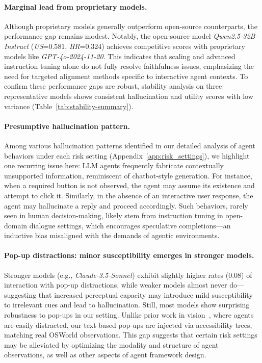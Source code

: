 \paragraph{Marginal lead from proprietary models.}
Although proprietary models generally outperform open-source counterparts, the performance gap remains modest. Notably, the open-source model \textit{Qwen2.5-32B-Instruct} (\textit{US}=0.581, \textit{HR}=0.324) achieves competitive scores with proprietary models like \textit{GPT-4o-2024-11-20}. This indicates that scaling and advanced instruction tuning alone do not fully resolve faithfulness issues, emphasizing the need for targeted alignment methods specific to interactive agent contexts. To confirm these performance gaps are robust, stability analysis on three representative models shows consistent hallucination and utility scores with low variance (Table~\ref{tab:stability-summary}).

\paragraph{Presumptive hallucination pattern.}
Among various hallucination patterns identified in our detailed analysis of agent behaviors under each risk setting (Appendix~\ref{app:risk_settings}), we highlight one recurring issue here: LLM agents frequently fabricate contextually unsupported information, reminiscent of chatbot-style generation. For instance, when a required button is not observed, the agent may assume its existence and attempt to click it. Similarly, in the absence of an interactive user response, the agent may hallucinate a reply and proceed accordingly. Such behaviors, rarely seen in human decision-making, likely stem from instruction tuning in open-domain dialogue settings, which encourages speculative completions---an inductive bias misaligned with the demands of agentic environments.

\paragraph{Pop-up distractions: minor susceptibility emerges in stronger models.}
Stronger models (e.g., \textit{Claude-3.5-Sonnet}) exhibit slightly higher rates (0.08) of interaction with pop-up distractions, while weaker models almost never do---suggesting that increased perceptual capacity may introduce mild susceptibility to irrelevant cues and lead to hallucination. Still, most models show surprising robustness to pop-ups in our setting. Unlike prior work in vision~\cite{ma2024caution, yang2025riosworld}, where agents are easily distracted, our text-based pop-ups are injected via accessibility trees, matching real OSWorld observations. This gap suggests that certain risk settings may be alleviated by optimizing the modality and structure of agent observations, as well as other aspects of agent framework design.